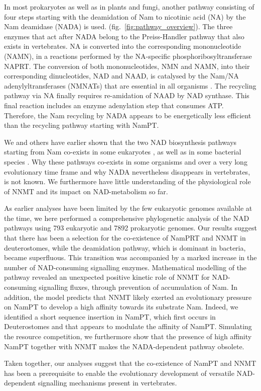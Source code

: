 In most prokaryotes as well as in plants and fungi, another pathway consisting of four steps starting with the deamidation of Nam to nicotinic acid (NA) by the Nam deamidase (NADA) is used. (fig.~\ref{fig:pathway_overview}). The three enzymes that act after NADA belong to the Preiss-Handler pathway that also exists in vertebrates. NA is converted into the corresponding mononucleotide (NAMN), in a reactions performed by the NA-specific phosphoribosyltransferase NAPRT. The conversion of both mononucleotides, NMN and NAMN, into their corresponding dinucleotides, NAD and NAAD, is catalysed by the Nam/NA adenylyltransferases (NMNATs) that are essential in all organisms \cite{DeFigueiredo2011}. The recycling pathway via NA finally requires re-amidation of NAAD by NAD synthase. This final reaction includes an enzyme adenylation step that consumes ATP. Therefore, the Nam recycling by NADA appears to be energetically less efficient than the recycling pathway starting with NamPT.

We and others have earlier shown that the two NAD biosynthesis pathways starting from Nam co-exists in some eukaryotes \cite{Gossmann2012FEBS,Carneiro2013}, as well as in some bacterial species \cite{Gazzaniga2009}. Why these pathways co-exists in some organisms and over a very long evolutionary time frame and why NADA nevertheless disappears in vertebrates, is not known. We furthermore have little understanding of the physiological role of NNMT and its impact on NAD-metabolism so far.

As earlier analyses have been limited by the few eukaryotic genomes available at the time, we here performed a comprehensive phylogenetic analysis of the NAD pathways using 793 eukaryotic and 7892 prokaryotic genomes. Our results suggest that there has been a selection for the co-existence of NamPRT and NNMT in deuterostomes, while the deamidation pathway, which is dominant in bacteria, became superfluous. This transition was accompanied by a marked increase in the number of NAD-consuming signalling enzymes. Mathematical modelling of the pathway revealed an unexpected positive kinetic role of NNMT for NAD-consuming signalling fluxes, through prevention of accumulation of Nam. In addition, the model predicts that NNMT likely exerted an evolutionary pressure on NamPT to develop a high affinity towards its substrate Nam. Indeed, we identified a short sequence insertion in NamPT, which first occurs in Deuterostomes and that appears to modulate the affinity of NamPT. Simulating the resource competition, we furthermore show that the presence of high affinity NamPT together with NNMT makes the NADA-dependent pathway obsolete.

Taken together, our analyses suggest that the co-existence of NamPT and NNMT has been a prerequisite to enable the evolutionary development of versatile NAD-dependent signalling mechanisms present in vertebrates.

